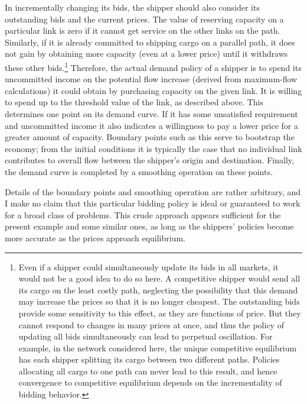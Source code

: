 In incrementally changing its bids, the shipper should also consider its
outstanding
bids and the current prices. The value of reserving capacity on a
particular link is zero if it cannot get service on the other links on the
path. Similarly, if it is already committed to shipping cargo on a parallel
path, it does not gain by obtaining more capacity (even at a lower price)
until it withdraws these other bids.\footnote{Even if a shipper could simultaneously
update its bids in all markets, it would not be a good idea to do so here.
A competitive shipper would send all its cargo on the least costly path,
neglecting the possibility that this demand may increase the prices so that it is no
longer cheapest.
The outstanding bids provide some sensitivity to this effect, as they are
functions of price.
But they cannot respond to changes in many prices at once, and thus the policy of 
updating all bids simultaneously can lead to perpetual oscillation.
For example, in the network considered here, the unique competitive equilibrium
has each shipper splitting its cargo between two different paths.
Policies allocating all cargo to one path can never lead to this result, and hence 
convergence to competitive equilibrium depends on the incrementality of bidding behavior.}
Therefore, the actual demand policy of a shipper is to spend its uncommitted income
on the potential flow 
increase (derived from maximum-flow calculations) it could obtain by purchasing
capacity on the given link.
It is willing to spend up to the threshold value of the link, as
described above.
This determines one point on its demand curve.  If it has some unsatisfied 
requirement and uncommitted income it also indicates a willingness to pay a
lower price for a greater amount of capacity.
Boundary points such as this serve to bootstrap the economy; from the 
initial conditions it is typically the case that no individual link 
contributes to overall flow between the shipper's origin and destination.
Finally, the demand curve is completed by a smoothing 
operation on these points.

Details of the boundary points and smoothing 
operation are rather arbitrary, and I make no claim that this particular bidding 
policy is ideal or guaranteed to work for a broad class of problems.  
This crude approach appears sufficient for the present example and some 
similar ones, as long as the shippers' policies become more accurate as 
the prices approach equilibrium.

